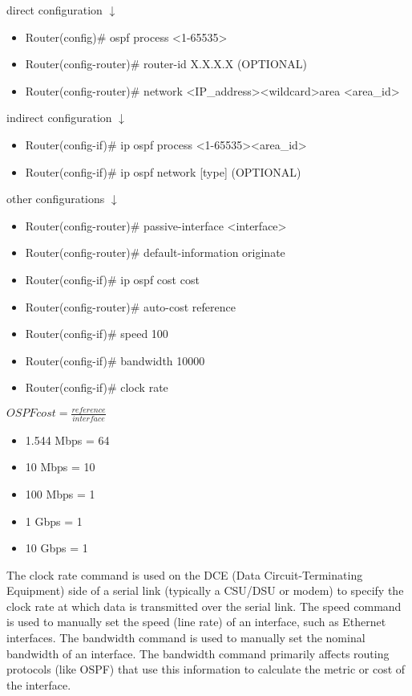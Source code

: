 \documentclass{article}
\begin{document}
direct configuration $\downarrow$
\begin{itemize}
\item Router(config)\# ospf process \textless 1-65535\textgreater
\item Router(config-router)\# router-id X.X.X.X (OPTIONAL)
\item Router(config-router)\# network \textless IP\_address\textgreater \textless wildcard\textgreater area \textless area\_id\textgreater
\end{itemize}
	
indirect configuration $\downarrow$
\begin{itemize}
\item Router(config-if)\# ip ospf process \textless 1-65535\textgreater \textless area\_id\textgreater
\item Router(config-if)\# ip ospf network [type] (OPTIONAL)
\end{itemize}
		
other configurations $\downarrow$
\begin{itemize}
\item Router(config-router)\# passive-interface \textless interface\textgreater
\item Router(config-router)\# default-information originate
\item Router(config-if)\# ip ospf cost cost
\item Router(config-router)\# auto-cost reference
\item Router(config-if)\# speed 100
\item Router(config-if)\# bandwidth 10000
\item Router(config-if)\# clock rate
\end{itemize}

$OSPF cost = \frac{reference}{interface}$

\begin{itemize}
\item 1.544 Mbps = 64
\item 10 Mbps = 10
\item 100 Mbps = 1
\item 1 Gbps = 1
\item 10 Gbps = 1
\end{itemize}

The clock rate command is used on the DCE (Data Circuit-Terminating Equipment) side of a serial link (typically a CSU/DSU or modem) to specify the clock rate at which data is transmitted over the serial link. The speed command is used to manually set the speed (line rate) of an interface, such as Ethernet interfaces. The bandwidth command is used to manually set the nominal bandwidth of an interface. The bandwidth command primarily affects routing protocols (like OSPF) that use this information to calculate the metric or cost of the interface.\\
\end{document}
